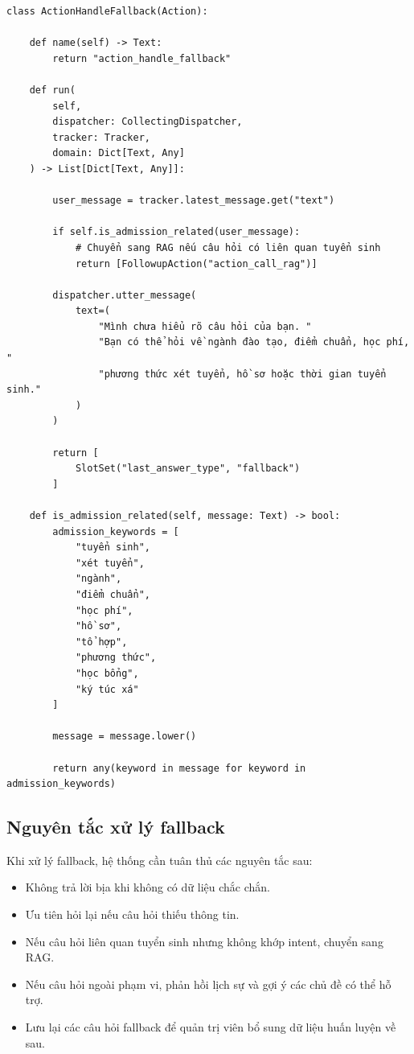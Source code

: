 \begin{verbatim}
class ActionHandleFallback(Action):

    def name(self) -> Text:
        return "action_handle_fallback"

    def run(
        self,
        dispatcher: CollectingDispatcher,
        tracker: Tracker,
        domain: Dict[Text, Any]
    ) -> List[Dict[Text, Any]]:

        user_message = tracker.latest_message.get("text")

        if self.is_admission_related(user_message):
            # Chuyển sang RAG nếu câu hỏi có liên quan tuyển sinh
            return [FollowupAction("action_call_rag")]

        dispatcher.utter_message(
            text=(
                "Mình chưa hiểu rõ câu hỏi của bạn. "
                "Bạn có thể hỏi về ngành đào tạo, điểm chuẩn, học phí, "
                "phương thức xét tuyển, hồ sơ hoặc thời gian tuyển sinh."
            )
        )

        return [
            SlotSet("last_answer_type", "fallback")
        ]

    def is_admission_related(self, message: Text) -> bool:
        admission_keywords = [
            "tuyển sinh",
            "xét tuyển",
            "ngành",
            "điểm chuẩn",
            "học phí",
            "hồ sơ",
            "tổ hợp",
            "phương thức",
            "học bổng",
            "ký túc xá"
        ]

        message = message.lower()

        return any(keyword in message for keyword in admission_keywords)
\end{verbatim}

\subsection*{Nguyên tắc xử lý fallback}

Khi xử lý fallback, hệ thống cần tuân thủ các nguyên tắc sau:
\begin{itemize}
    \item Không trả lời bịa khi không có dữ liệu chắc chắn.
    \item Ưu tiên hỏi lại nếu câu hỏi thiếu thông tin.
    \item Nếu câu hỏi liên quan tuyển sinh nhưng không khớp intent, chuyển sang RAG.
    \item Nếu câu hỏi ngoài phạm vi, phản hồi lịch sự và gợi ý các chủ đề có thể hỗ trợ.
    \item Lưu lại các câu hỏi fallback để quản trị viên bổ sung dữ liệu huấn luyện về sau.
\end{itemize}
